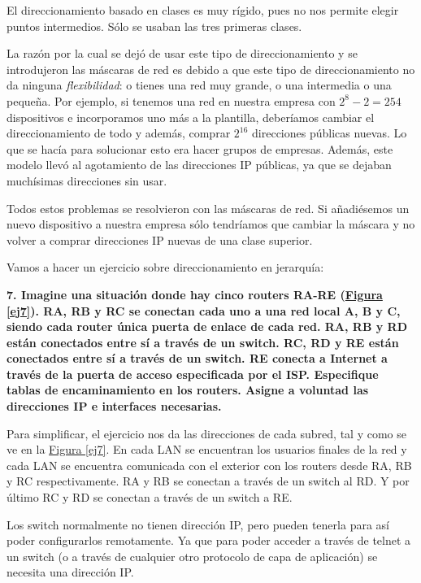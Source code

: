 \documentclass[10pt,a4paper,spanish]{report}
\begin{document}
El direccionamiento basado en clases es muy rígido, pues no nos permite elegir puntos intermedios. Sólo se usaban las tres primeras clases. 

La razón por la cual se dejó de usar este tipo de direccionamiento y se introdujeron las máscaras de red es debido a que este tipo de direccionamiento no da ninguna \textit{\textcolor{tema4}{flexibilidad}}: o tienes una red muy grande, o una intermedia o una pequeña. Por ejemplo, si tenemos una red en nuestra empresa con $2^{8} - 2 = 254$ dispositivos e incorporamos uno más a la plantilla, deberíamos cambiar el direccionamiento de todo y además, comprar $2^{16}$ direcciones públicas nuevas. Lo que se hacía para solucionar esto era hacer grupos de empresas. Además, este modelo llevó al agotamiento de las direcciones IP públicas, ya que se dejaban muchísimas direcciones sin usar.

Todos estos problemas se resolvieron con las máscaras de red. Si añadiésemos un nuevo dispositivo a nuestra empresa sólo tendríamos que cambiar la máscara y no volver a comprar direcciones IP nuevas de una clase superior.

Vamos a hacer un ejercicio sobre direccionamiento en jerarquía:

\textbf{7. Imagine una situación donde hay cinco routers RA-RE (\hyperref[ej7]{Figura \ref*{ej7}}). RA, RB y RC se conectan cada uno a una red local A, B y C, siendo cada router única puerta de enlace de cada red. RA, RB y RD están conectados entre sí a través de un switch. RC, RD y RE están conectados entre sí a través de un switch. RE conecta a Internet a través de la puerta de acceso especificada por el ISP. Especifique tablas de encaminamiento en los routers. Asigne a voluntad las direcciones IP e interfaces necesarias.}

Para simplificar, el ejercicio nos da las direcciones de cada subred, tal y como se ve en la \hyperref[ej7]{Figura \ref*{ej7}}. En cada LAN se encuentran los usuarios finales de la red y cada LAN se encuentra comunicada con el exterior con los routers desde RA, RB y RC respectivamente. RA y RB se conectan a través de un switch al RD. Y por último RC y RD se conectan a través de un switch a RE. 

Los switch normalmente no tienen dirección IP, pero pueden tenerla para así poder configurarlos remotamente. Ya que para poder acceder a través de telnet a un switch (o a través de cualquier otro protocolo de capa de aplicación) se necesita una dirección IP.
\end{document}
